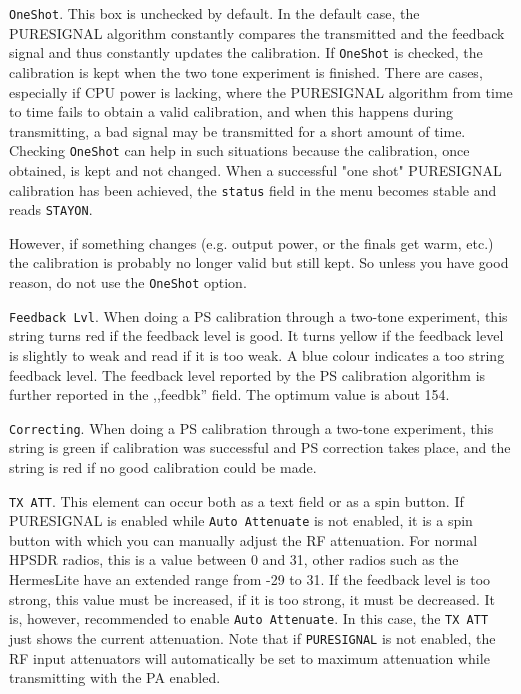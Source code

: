 \documentclass[12pt]{book}
\def\rett#1{\texttt{\color{red}#1}}
\def\bltt#1{\texttt{\color{blue}#1}}
\begin{document}
\rett{OneShot}. This box is unchecked by default. In the default case, the PURESIGNAL
algorithm constantly compares the transmitted and the feedback signal and thus
constantly updates the calibration. If \rett{OneShot} is checked, the calibration
is kept when the two tone experiment is finished. There are cases, especially if
CPU power is lacking, where the PURESIGNAL algorithm from time to time fails to obtain
a valid calibration, and when this happens during transmitting, a bad signal may
be transmitted for a short amount of time. Checking \rett{OneShot} can help in such
situations because the calibration, once obtained, is kept and not changed.
When a successful "one shot" PURESIGNAL calibration has been achieved, the \bltt{status}
field in the menu becomes stable and reads \texttt{STAYON}.

However, if something changes (e.g. output power, or the finals get warm, etc.) the
calibration is probably no longer valid but still kept. So unless you have good reason,
do not use the \rett{OneShot} option.


\rett{Feedback Lvl}. When doing a PS calibration through a two-tone experiment, this string
turns red if the feedback level is good. It turns yellow if the feedback level is slightly
to weak and read if it is too weak. A blue colour indicates a too string feedback level.
The feedback level reported by the PS calibration algorithm is further reported in the
,,feedbk'' field. The optimum value is about 154.

\rett{Correcting}. When doing a PS calibration through a two-tone experiment, this string
is green if calibration was successful and PS correction takes place, and the string is
red if no good calibration could be made.

\rett{TX ATT}. This element can occur both as a text field or as a spin button.
If PURESIGNAL is enabled while \rett{Auto Attenuate} is not enabled, it is a spin button with which
you can manually adjust the RF attenuation. For normal HPSDR radios, this is a value
between 0 and 31, other radios such as the HermesLite have an extended range from
-29 to 31. If the feedback level is too strong, this value must be increased, if it
is too strong, it must be decreased. It is, however, recommended to enable \rett{Auto Attenuate}.
In this case, the \rett{TX ATT} just shows the current attenuation.
Note that if \texttt{PURESIGNAL} is not enabled, the RF input attenuators
will automatically be set to maximum attenuation while transmitting with the PA enabled.
\end{document}
